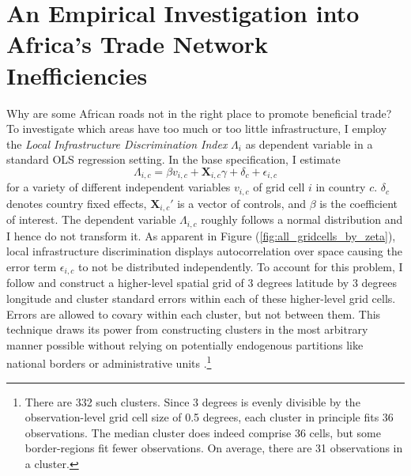 \documentclass[11pt, oneside]{article}   	%
\let\oldref\ref
\renewcommand{\ref}[1]{(\oldref{#1})}
\begin{document}
\section{An Empirical Investigation into Africa's Trade Network Inefficiencies}
\label{chap:results}
Why are some African roads not in the right place to promote beneficial trade? To investigate which areas have too much or too little infrastructure, I employ the \emph{Local Infrastructure Discrimination Index} $\Lambda_{i}$ as dependent variable in a standard OLS regression setting. In the base specification, I estimate
\begin{equation}
  \Lambda_{i,c} = \beta v_{i,c} + \textbf{X}_{i,c}\gamma + \delta_{c} + \epsilon_{i,c}
  \label{eq:grid_ols}
\end{equation}
for a variety of different independent variables $v_{i,c}$ of grid cell $i$ in country $c$. $\delta_{c}$ denotes country fixed effects, $\textbf{X}_{i,c}'$ is a vector of controls, and $\beta$ is the coefficient of interest. The dependent variable $\Lambda_{i,c}$ roughly follows a normal distribution and I hence do not transform it. As apparent in Figure \ref{fig:all_gridcells_by_zeta}, local infrastructure discrimination displays autocorrelation over space causing the error term $\epsilon_{i,c}$ to not be distributed independently. To account for this problem, I follow \cite{Bester_Inferencedependentdata_2011} and construct a higher-level spatial grid of 3 degrees latitude by 3 degrees longitude and cluster standard errors within each of these higher-level grid cells. Errors are  allowed to covary within each cluster, but not between them. This technique draws its power from constructing clusters in the most arbitrary manner possible without relying on potentially endogenous partitions like national borders or administrative units \citep[see e.g.][]{Michaels_ResettingUrbanNetwork_2017}.\footnote{There are 332 such clusters. Since 3 degrees is evenly divisible by the observation-level grid cell size of 0.5 degrees, each cluster in principle fits 36 observations. The median cluster does indeed comprise 36 cells, but some border-regions fit fewer observations. On average, there are 31 observations in a cluster.}
\end{document}
